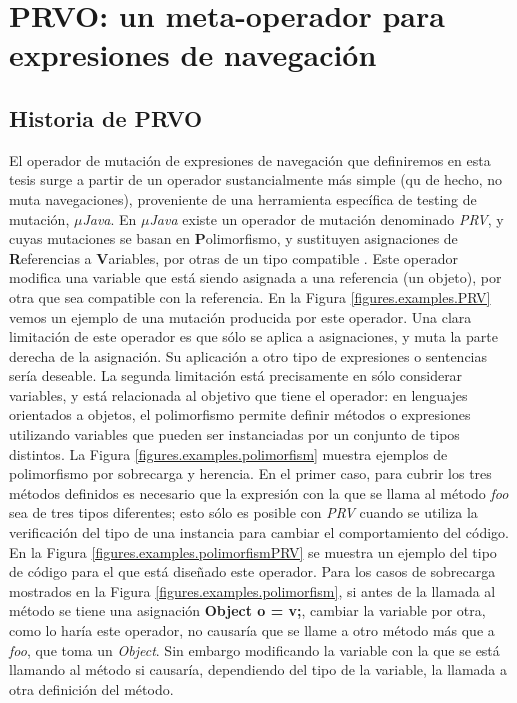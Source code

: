 \chapter[PRVO]{PRVO: un meta-operador para expresiones de navegaci\'on}
\label{cap:prvo}

\section{Historia de PRVO}
\label{sec:prvo.history}
El operador de mutaci\'on de expresiones de navegaci\'on que definiremos en esta tesis surge a partir de un operador sustancialmente m\'as simple (qu de hecho, no muta navegaciones), proveniente de una herramienta espec\'ifica de testing de mutaci\'on, \emph{$\mu$Java}. En \emph{$\mu$Java} existe un operador de mutaci\'on denominado \emph{PRV}, y cuyas mutaciones se basan en \textbf{P}olimorfismo, y sustituyen asignaciones de \textbf{R}eferencias a \textbf{V}ariables, por otras de un tipo compatible \cite{muJavaCOPS, bibliography.mutation.operators.MaKO02}. Este operador modifica una variable que est\'a siendo asignada a una referencia (un objeto), por otra que sea compatible con la referencia. En la Figura \ref{figures.examples.PRV} vemos un ejemplo de una mutaci\'on producida por este operador. Una clara limitaci\'on de este operador es que s\'olo se aplica a asignaciones, y muta la parte derecha de la asignaci\'on. Su aplicaci\'on a otro tipo de expresiones o sentencias ser\'ia deseable. La segunda limitaci\'on est\'a precisamente en s\'olo considerar variables, y est\'a relacionada al objetivo que tiene el operador: en lenguajes orientados a objetos, el polimorfismo permite definir m\'etodos o expresiones utilizando variables que pueden ser instanciadas por un conjunto de tipos distintos. La Figura \ref{figures.examples.polimorfism} muestra ejemplos de polimorfismo por sobrecarga y herencia. En el primer caso, para cubrir los tres m\'etodos definidos es necesario que la expresi\'on con la que se llama al m\'etodo \emph{foo} sea de tres tipos diferentes; esto s\'olo es posible con \emph{PRV} cuando se utiliza la verificaci\'on del tipo de una instancia para cambiar el comportamiento del c\'odigo. En la Figura \ref{figures.examples.polimorfismPRV} se muestra un ejemplo del tipo de c\'odigo para el que est\'a dise\~nado este operador. Para los casos de sobrecarga mostrados en la Figura \ref{figures.examples.polimorfism}, si antes de la llamada al m\'etodo se tiene una asignaci\'on \textbf{Object o = v;}, cambiar la variable por otra, como lo har\'ia este operador, no causar\'ia que se llame a otro m\'etodo m\'as que a \emph{foo}, que toma un \emph{Object}. Sin embargo modificando la variable con la que se est\'a llamando al m\'etodo si causar\'ia, dependiendo del tipo de la variable, la llamada a otra definici\'on del m\'etodo. 

